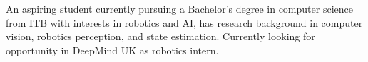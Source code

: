 

\begin{cvparagraph}
An aspiring student currently pursuing a Bachelor's degree in computer science from ITB with interests in robotics and AI, has research background in computer vision, robotics perception, and state estimation. Currently looking for opportunity in DeepMind UK as robotics intern.
\end{cvparagraph}

